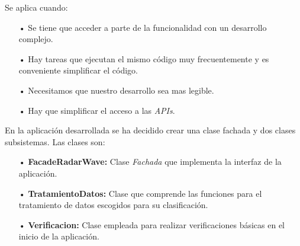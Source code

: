 Se aplica cuando:
\begin{itemize}
\item[•]Se tiene que acceder a parte de la funcionalidad con un desarrollo complejo.
\item[•]Hay tareas que ejecutan el mismo código muy frecuentemente y es conveniente simplificar el código.
\item[•]Necesitamos que nuestro desarrollo sea mas legible.
\item[•]Hay que simplificar el acceso a las \textit{APIs}.
\end{itemize}

En la aplicación desarrollada se ha decidido crear una clase fachada y dos clases subsistemas.
Las clases son:
\begin{itemize}
\item[•] \textbf{FacadeRadarWave:} Clase \textit{Fachada} que implementa la interfaz de la aplicación.
\item[•] \textbf{TratamientoDatos:} Clase que comprende las funciones para el tratamiento de datos escogidos para su clasificación.
\item[•] \textbf{Verificacion:} Clase empleada para realizar verificaciones básicas en el inicio de la aplicación.
\end{itemize}

